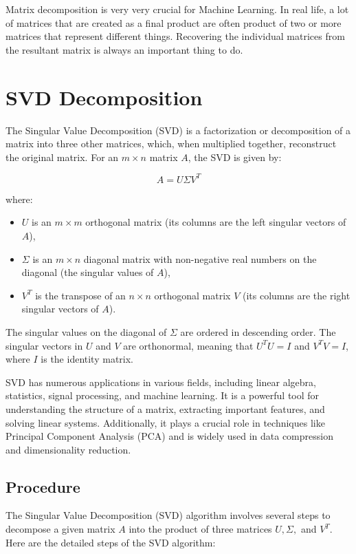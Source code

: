 Matrix decomposition is very very crucial for Machine Learning. In real life, a lot of matrices that are created as a final product are often product of two or more matrices that represent different things. Recovering the individual matrices from the resultant matrix is always an important thing to do. 


\section{SVD Decomposition}

The Singular Value Decomposition (SVD) is a factorization or decomposition of a matrix into three other matrices, which, when multiplied together, reconstruct the original matrix. For an $m \times n$ matrix $A$, the SVD is given by:

\[ A = U \Sigma V^T \]

where:
\begin{itemize}
    \item $U$ is an $m \times m$ orthogonal matrix (its columns are the left singular vectors of $A$),
    \item $\Sigma$ is an $m \times n$ diagonal matrix with non-negative real numbers on the diagonal (the singular values of $A$),
    \item $V^T$ is the transpose of an $n \times n$ orthogonal matrix $V$ (its columns are the right singular vectors of $A$).
\end{itemize}

The singular values on the diagonal of $\Sigma$ are ordered in descending order. The singular vectors in $U$ and $V$ are orthonormal, meaning that $U^T U = I$ and $V^T V = I$, where $I$ is the identity matrix.

SVD has numerous applications in various fields, including linear algebra, statistics, signal processing, and machine learning. It is a powerful tool for understanding the structure of a matrix, extracting important features, and solving linear systems. Additionally, it plays a crucial role in techniques like Principal Component Analysis (PCA) and is widely used in data compression and dimensionality reduction.

\subsection{Procedure}

The Singular Value Decomposition (SVD) algorithm involves several steps to decompose a given matrix \( A \) into the product of three matrices \( U, \Sigma, \) and \( V^T \). Here are the detailed steps of the SVD algorithm:

